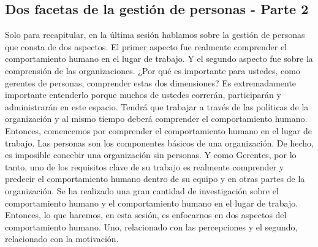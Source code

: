 \documentclass[10pt]{book}
\begin{document}
\subsection{Dos facetas de la gestión de personas - Parte 2}
Solo para recapitular, en la última sesión hablamos sobre la gestión de personas que consta de dos aspectos. El primer aspecto fue realmente comprender el comportamiento humano en el lugar de trabajo. Y el segundo aspecto fue sobre la comprensión de las organizaciones. ¿Por qué es importante para ustedes, como gerentes de personas, comprender estas dos dimensiones? Es extremadamente importante entenderlo porque muchos de ustedes correrán, participarán y administrarán en este espacio. Tendrá que trabajar a través de las políticas de la organización y al mismo tiempo deberá comprender el comportamiento humano. Entonces, comencemos por comprender el comportamiento humano en el lugar de trabajo. Las personas son los componentes básicos de una organización. De hecho, es imposible concebir una organización sin personas. Y como Gerentes, por lo tanto, uno de los requisitos clave de su trabajo es realmente comprender y predecir el comportamiento humano dentro de su equipo y en otras partes de la organización. Se ha realizado una gran cantidad de investigación sobre el comportamiento humano y el comportamiento humano en el lugar de trabajo. Entonces, lo que haremos, en esta sesión, es enfocarnos en dos aspectos del comportamiento humano. Uno, relacionado con las percepciones y el segundo, relacionado con la motivación.
\end{document}
